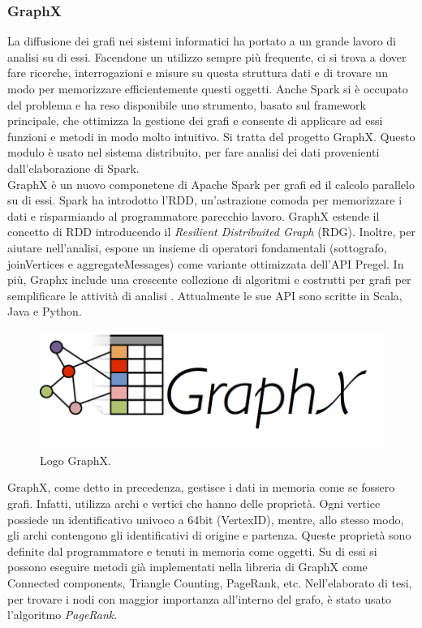 \subsubsection{GraphX}
\label{sub:graphX}
La diffusione dei grafi nei sistemi informatici ha portato a un grande lavoro di analisi su di essi. Facendone un utilizzo sempre più frequente, ci si trova a dover fare ricerche, interrogazioni e misure su questa struttura dati e di trovare un modo per memorizzare efficientemente questi oggetti. Anche Spark si è occupato del problema e ha reso disponibile uno strumento, basato sul framework principale, che ottimizza la gestione dei grafi e consente di applicare ad essi funzioni e metodi in modo molto intuitivo. Si tratta del progetto GraphX. Questo modulo è usato nel sistema distribuito, per fare analisi dei dati provenienti dall'elaborazione di Spark.
\\GraphX è un nuovo componetene di Apache Spark per grafi ed il calcolo parallelo su di essi.  Spark ha introdotto l'RDD, un'astrazione comoda per memorizzare i dati e risparmiando al programmatore parecchio lavoro. GraphX estende il concetto di RDD introducendo il \textit{Resilient Distribuited Graph} (RDG). Inoltre, per aiutare nell'analisi, espone un insieme di operatori fondamentali (sottografo, joinVertices e aggregateMessages) come variante ottimizzata dell'API Pregel. In più, Graphx include una crescente collezione di algoritmi e costrutti per grafi per semplificare le attività di analisi \cite{spark:graphx}. Attualmente le sue API sono scritte in Scala, Java e Python.
\begin{figure}[H]
	\centering
	\includegraphics[width=\textwidth, height=0.15\textheight, keepaspectratio]{images/graphxLogo.png}
	\caption{Logo GraphX.}
	\label{fig:graphxLogo}
\end{figure}
GraphX, come detto in precedenza, gestisce i dati in memoria come se fossero grafi. Infatti, utilizza archi e vertici che hanno delle proprietà. Ogni vertice possiede un identificativo univoco a 64bit (VertexID), mentre, allo stesso modo, gli archi contengono gli identificativi di origine e partenza. Queste proprietà sono definite dal programmatore e tenuti in memoria come oggetti. Su di essi si possono eseguire metodi già implementati nella libreria di GraphX come Connected components, Triangle Counting, PageRank, etc. Nell'elaborato di tesi, per trovare i nodi con maggior importanza all'interno del grafo, è stato usato l'algoritmo \textit{PageRank}.

